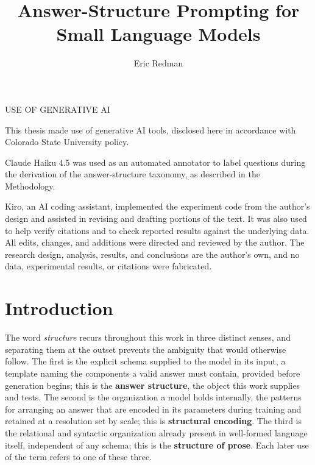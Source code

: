\documentclass[master]{thesis}
\title{Answer-Structure Prompting for Small Language Models}
\author{Eric Redman}
\newcommand{\aidisclosure}{%
This thesis made use of generative AI tools, disclosed here in accordance with Colorado State University policy.

\vspace{1em}

Claude Haiku 4.5 was used as an automated annotator to label questions during the derivation of the answer-structure taxonomy, as described in the Methodology.

\vspace{1em}

Kiro, an AI coding assistant, implemented the experiment code from the author's design and assisted in revising and drafting portions of the text. It was also used to help verify citations and to check reported results against the underlying data. All edits, changes, and additions were directed and reviewed by the author. The research design, analysis, results, and conclusions are the author's own, and no data, experimental results, or citations were fabricated.
}
\newcommand{\makeaidisclosure}{%
    \prelimtocentry{Use of Generative AI}

    \begin{flatcenter}
        USE OF GENERATIVE AI

        \vspace{3em}
    \end{flatcenter}

    \aidisclosure \par

    \newpage
}
\begin{document}
\frontmatter

\maketitle
\makemycopyright
\makeabstract
\makeacknowledgements
\makeaidisclosure

\tableofcontents
\listoftables
\listoffigures

\mainmatter


\chapter{Introduction}
\label{ch:intro}

The word \emph{structure} recurs throughout this work in three distinct senses, and separating them at the outset prevents the ambiguity that would otherwise follow. The first is the explicit schema supplied to the model in its input, a template naming the components a valid answer must contain, provided before generation begins; this is the \textbf{answer structure}, the object this work supplies and tests. The second is the organization a model holds internally, the patterns for arranging an answer that are encoded in its parameters during training and retained at a resolution set by scale; this is \textbf{structural encoding}. The third is the relational and syntactic organization already present in well-formed language itself, independent of any schema; this is the \textbf{structure of prose}. Each later use of the term refers to one of these three.
\end{document}

